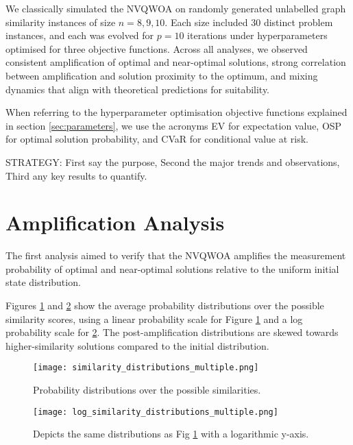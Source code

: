 We classically simulated the NVQWOA on randomly generated unlabelled graph similarity instances of size $n=8,9,10$. Each size included 30 distinct problem instances, and each was evolved for $p=10$ iterations under hyperparameters optimised for three objective functions. Across all analyses, we observed consistent amplification of optimal and near-optimal solutions, strong correlation between amplification and solution proximity to the optimum, and mixing dynamics that align with theoretical predictions for suitability.

When referring to the hyperparameter optimisation objective functions explained in section \ref{sec:parameters}, we use the acronyms EV for expectation value, OSP for optimal solution probability, and CVaR for conditional value at risk.

STRATEGY:
First say the purpose, Second the major trends and observations, Third any key results to quantify.

\section{Amplification Analysis}
The first analysis aimed to verify that the NVQWOA amplifies the measurement probability of optimal and near-optimal solutions relative to the uniform initial state distribution. 

Figures \ref{fig:similarity dist} and \ref{fig:similarity log dist} show the average probability distributions over the possible similarity scores, using a linear probability scale for Figure \ref{fig:similarity dist} and a log probability scale for \ref{fig:similarity log dist}. The post-amplification distributions are skewed towards higher-similarity solutions compared to the initial distribution.


\begin{figure}[htbp]
    \centering
    \texttt{[image: similarity\_distributions\_multiple.png]} 
    \caption{Probability distributions over the possible similarities.}
    \label{fig:similarity dist}
\end{figure}

\begin{figure}[htbp]
    \centering
    \texttt{[image: log\_similarity\_distributions\_multiple.png]} 
    \caption{Depicts the same distributions as Fig \ref{fig:similarity dist} with a logarithmic y-axis.}
    \label{fig:similarity log dist}
\end{figure}

